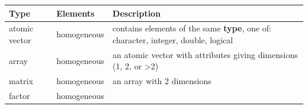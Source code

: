 \documentclass[
]{book}
\begin{document}
\begin{longtable}[]{@{}lll@{}}
\toprule
\begin{minipage}[b]{0.10\columnwidth}\raggedright
Type\strut
\end{minipage} & \begin{minipage}[b]{0.10\columnwidth}\raggedright
Elements\strut
\end{minipage} & \begin{minipage}[b]{0.71\columnwidth}\raggedright
Description\strut
\end{minipage}\tabularnewline
\midrule
\endhead
\begin{minipage}[t]{0.10\columnwidth}\raggedright
atomic vector\strut
\end{minipage} & \begin{minipage}[t]{0.10\columnwidth}\raggedright
homogeneous\strut
\end{minipage} & \begin{minipage}[t]{0.71\columnwidth}\raggedright
contains elements of the same \textbf{type}, one of: character, integer, double, logical\strut
\end{minipage}\tabularnewline
\begin{minipage}[t]{0.10\columnwidth}\raggedright
array\strut
\end{minipage} & \begin{minipage}[t]{0.10\columnwidth}\raggedright
homogeneous\strut
\end{minipage} & \begin{minipage}[t]{0.71\columnwidth}\raggedright
an atomic vector with attributes giving dimensions (1, 2, or \textgreater2)\strut
\end{minipage}\tabularnewline
\begin{minipage}[t]{0.10\columnwidth}\raggedright
matrix\strut
\end{minipage} & \begin{minipage}[t]{0.10\columnwidth}\raggedright
homogeneous\strut
\end{minipage} & \begin{minipage}[t]{0.71\columnwidth}\raggedright
an array with 2 dimensions\strut
\end{minipage}\tabularnewline
\begin{minipage}[t]{0.10\columnwidth}\raggedright
factor\strut
\end{minipage} & \begin{minipage}[t]{0.10\columnwidth}\raggedright
homogeneous\strut
\end{minipage} & \begin{minipage}[t]{0.71\columnwidth}\raggedright

\end{minipage}
\end{longtable}
\end{document}
